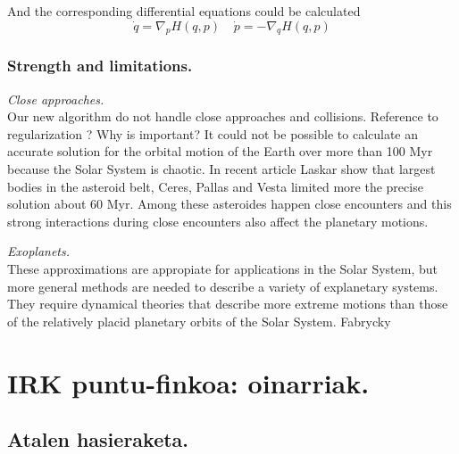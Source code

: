 And the corresponding differential equations could be calculated
\begin{equation}
\dot{q}={\nabla }_pH(q,p)\ \ \, \ \ \dot{p}=-{\nabla }_qH(q,p)
\end{equation}

\subsubsection*{Strength and limitations.}
\label{sec:43}

\vspace{5mm}
\textit{Close approaches.}\\
Our new algorithm do not handle close approaches and collisions.  Reference to regularization ?
Why is important? It could not be possible to calculate an accurate solution for the orbital motion of the Earth over more than 100 Myr because the Solar System is chaotic.  In recent article Laskar \cite{Laskar2011a} show that largest bodies in the asteroid belt, Ceres, Pallas and Vesta limited more the precise solution about 60 Myr. Among these asteroides happen close encounters and this strong interactions during close encounters also affect the planetary motions. 


\vspace{5mm}
\textit{Exoplanets.}\\
These approximations are appropiate for applications in the Solar System, but more general methods are needed to describe a variety of explanetary systems.  They require dynamical theories that describe more extreme motions than those of the relatively placid planetary orbits of the Solar System. Fabrycky \cite{Fabrycky2010}

\section{IRK puntu-finkoa: oinarriak.}

\subsection*{Atalen hasieraketa.}


